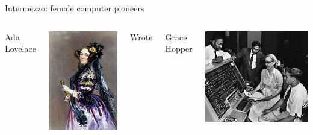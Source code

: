 \documentclass[aspectratio=169,usenames,dvipsnames]{beamer}
\begin{document}
\begin{frame}{Intermezzo: female computer pioneers}
    \begin{columns}[T]
		Ada Lovelace %

		\vspace{1ex}
		\includegraphics[width=0.9\linewidth,trim={0 1cm 0 1cm},clip]{fig/ada}
		
		Wrote 

		\pause
		Grace Hopper %
		
		\vspace{1ex}
		\includegraphics[width=0.9\linewidth]{fig/gracehopper}


\end{columns}
\end{frame}
\end{document}
